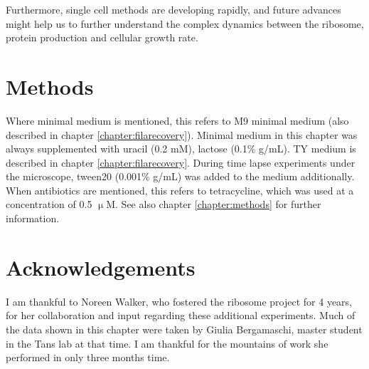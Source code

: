 
Furthermore, single cell methods are developing rapidly, and future advances might help us to further understand the complex dynamics between the ribosome, protein production and cellular growth rate.




\section{Methods}

Where minimal medium is mentioned, this refers to M9 minimal medium (also described in chapter \ref{chapter:filarecovery}).
%
Minimal medium in this chapter was always supplemented with uracil (0.2 mM), lactose (0.1\% g/mL).
TY medium is described in chapter \ref{chapter:filarecovery}.
%
During time lapse experiments under the microscope, tween20 (0.001\% g/mL) was added to the medium additionally.
%
When antibiotics are mentioned, this refers to tetracycline, which was used at a concentration of 0.5 $\upmu$M.
%
%
See also chapter \ref{chapter:methods} for further information.

\section{Acknowledgements}

%
I am thankful to Noreen Walker, who fostered the ribosome project for 4 years, for her collaboration and input regarding these additional experiments.
%
Much of the data shown in this chapter were taken by Giulia Bergamaschi, master student in the Tans lab at that time. I am thankful for 
the mountains of work she performed in only three months time.

